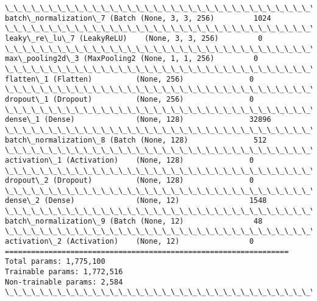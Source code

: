 \documentclass[11pt]{article}
\begin{document}
\begin{Verbatim}[commandchars=\\\{\}]
\_\_\_\_\_\_\_\_\_\_\_\_\_\_\_\_\_\_\_\_\_\_\_\_\_\_\_\_\_\_\_\_\_\_\_\_\_\_\_\_\_\_\_\_\_\_\_\_\_\_\_\_\_\_\_\_\_\_\_\_\_\_\_\_\_
batch\_normalization\_7 (Batch (None, 3, 3, 256)         1024      
\_\_\_\_\_\_\_\_\_\_\_\_\_\_\_\_\_\_\_\_\_\_\_\_\_\_\_\_\_\_\_\_\_\_\_\_\_\_\_\_\_\_\_\_\_\_\_\_\_\_\_\_\_\_\_\_\_\_\_\_\_\_\_\_\_
leaky\_re\_lu\_7 (LeakyReLU)    (None, 3, 3, 256)         0         
\_\_\_\_\_\_\_\_\_\_\_\_\_\_\_\_\_\_\_\_\_\_\_\_\_\_\_\_\_\_\_\_\_\_\_\_\_\_\_\_\_\_\_\_\_\_\_\_\_\_\_\_\_\_\_\_\_\_\_\_\_\_\_\_\_
max\_pooling2d\_3 (MaxPooling2 (None, 1, 1, 256)         0         
\_\_\_\_\_\_\_\_\_\_\_\_\_\_\_\_\_\_\_\_\_\_\_\_\_\_\_\_\_\_\_\_\_\_\_\_\_\_\_\_\_\_\_\_\_\_\_\_\_\_\_\_\_\_\_\_\_\_\_\_\_\_\_\_\_
flatten\_1 (Flatten)          (None, 256)               0         
\_\_\_\_\_\_\_\_\_\_\_\_\_\_\_\_\_\_\_\_\_\_\_\_\_\_\_\_\_\_\_\_\_\_\_\_\_\_\_\_\_\_\_\_\_\_\_\_\_\_\_\_\_\_\_\_\_\_\_\_\_\_\_\_\_
dropout\_1 (Dropout)          (None, 256)               0         
\_\_\_\_\_\_\_\_\_\_\_\_\_\_\_\_\_\_\_\_\_\_\_\_\_\_\_\_\_\_\_\_\_\_\_\_\_\_\_\_\_\_\_\_\_\_\_\_\_\_\_\_\_\_\_\_\_\_\_\_\_\_\_\_\_
dense\_1 (Dense)              (None, 128)               32896     
\_\_\_\_\_\_\_\_\_\_\_\_\_\_\_\_\_\_\_\_\_\_\_\_\_\_\_\_\_\_\_\_\_\_\_\_\_\_\_\_\_\_\_\_\_\_\_\_\_\_\_\_\_\_\_\_\_\_\_\_\_\_\_\_\_
batch\_normalization\_8 (Batch (None, 128)               512       
\_\_\_\_\_\_\_\_\_\_\_\_\_\_\_\_\_\_\_\_\_\_\_\_\_\_\_\_\_\_\_\_\_\_\_\_\_\_\_\_\_\_\_\_\_\_\_\_\_\_\_\_\_\_\_\_\_\_\_\_\_\_\_\_\_
activation\_1 (Activation)    (None, 128)               0         
\_\_\_\_\_\_\_\_\_\_\_\_\_\_\_\_\_\_\_\_\_\_\_\_\_\_\_\_\_\_\_\_\_\_\_\_\_\_\_\_\_\_\_\_\_\_\_\_\_\_\_\_\_\_\_\_\_\_\_\_\_\_\_\_\_
dropout\_2 (Dropout)          (None, 128)               0         
\_\_\_\_\_\_\_\_\_\_\_\_\_\_\_\_\_\_\_\_\_\_\_\_\_\_\_\_\_\_\_\_\_\_\_\_\_\_\_\_\_\_\_\_\_\_\_\_\_\_\_\_\_\_\_\_\_\_\_\_\_\_\_\_\_
dense\_2 (Dense)              (None, 12)                1548      
\_\_\_\_\_\_\_\_\_\_\_\_\_\_\_\_\_\_\_\_\_\_\_\_\_\_\_\_\_\_\_\_\_\_\_\_\_\_\_\_\_\_\_\_\_\_\_\_\_\_\_\_\_\_\_\_\_\_\_\_\_\_\_\_\_
batch\_normalization\_9 (Batch (None, 12)                48        
\_\_\_\_\_\_\_\_\_\_\_\_\_\_\_\_\_\_\_\_\_\_\_\_\_\_\_\_\_\_\_\_\_\_\_\_\_\_\_\_\_\_\_\_\_\_\_\_\_\_\_\_\_\_\_\_\_\_\_\_\_\_\_\_\_
activation\_2 (Activation)    (None, 12)                0         
=================================================================
Total params: 1,775,100
Trainable params: 1,772,516
Non-trainable params: 2,584
\_\_\_\_\_\_\_\_\_\_\_\_\_\_\_\_\_\_\_\_\_\_\_\_\_\_\_\_\_\_\_\_\_\_\_\_\_\_\_\_\_\_\_\_\_\_\_\_\_\_\_\_\_\_\_\_\_\_\_\_\_\_\_\_\_

\end{Verbatim}
\end{document}
